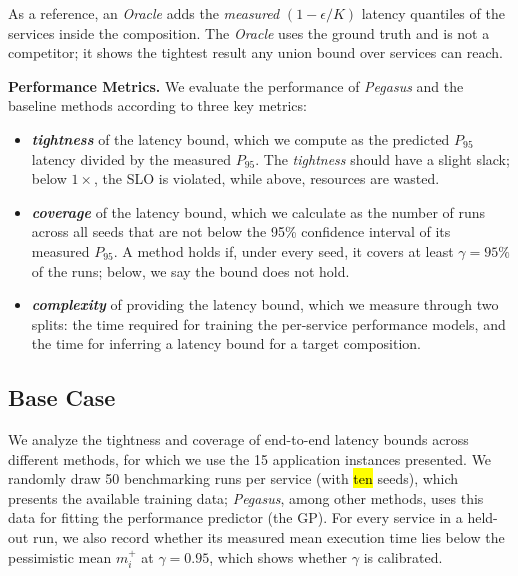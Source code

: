 As a reference, an \textit{Oracle} adds the \textit{measured} $(1-\epsilon/K)$ latency quantiles of the services inside the composition. The \textit{Oracle} uses the ground truth and is not a competitor; it shows the tightest result any union bound over services can reach.

\vspace{5pt}
\noindent
\textbf{Performance Metrics.}
%
We evaluate the performance of \textit{Pegasus} and the baseline methods according to three key metrics: 
%
\begin{itemize}
    \item \textit{\textbf{tightness}} of the latency bound, which we compute as the predicted $P_{95}$ latency divided by the measured $P_{95}$. The \textit{tightness} should have a slight slack; below $1\times$, the SLO is violated, while above, resources are wasted. 
    \item \textit{\textbf{coverage}} of the latency bound, which we calculate as the number of runs across all seeds that are not below the 95\% confidence interval of its measured $P_{95}$. A method holds if, under every seed, it covers at least $\gamma = 95\%$ of the runs; below, we say the bound does not hold.
    \item \textit{\textbf{complexity}} of providing the latency bound, which we measure through two splits: the time required for training the per-service performance models, and the time for inferring a latency bound for a target composition.
\end{itemize}


\subsection{Base Case}


\label{subsec:eval-base}

We analyze the tightness and coverage of end-to-end latency bounds across different methods, for which we use the 15 application instances presented. We randomly draw 50 benchmarking runs per service (with \hl{ten} seeds), which presents the available training data; \textit{Pegasus}, among other methods, uses this data for fitting the performance predictor (the GP). For every service in a held-out run, we also record whether its measured mean execution time lies below the pessimistic mean $m_i^{+}$ at $\gamma = 0.95$, which shows whether $\gamma$ is calibrated.

